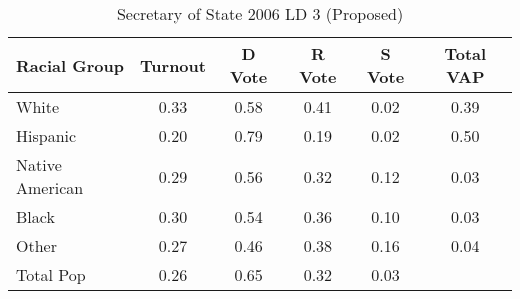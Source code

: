 \begin{table}[htb]
\begin{center}
\caption{Secretary of State 2006 LD 3 (Proposed)}
\label{sos06_vap_ld_3}
\begin{tabular}{lccccc}
  \hline
Racial Group & Turnout & D Vote & R Vote & S Vote & Total VAP \\ 
  \hline
White & 0.33 & 0.58 & 0.41 & 0.02 & 0.39 \\ 
  Hispanic & 0.20 & 0.79 & 0.19 & 0.02 & 0.50 \\ 
  Native American & 0.29 & 0.56 & 0.32 & 0.12 & 0.03 \\ 
  Black & 0.30 & 0.54 & 0.36 & 0.10 & 0.03 \\ 
  Other & 0.27 & 0.46 & 0.38 & 0.16 & 0.04 \\ 
  Total Pop & 0.26 & 0.65 & 0.32 & 0.03 &  \\ 
   \hline
\end{tabular}
\end{center}
\end{table}
